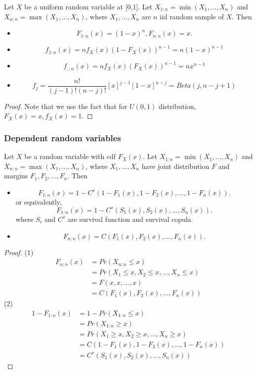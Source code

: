 \begin{refsection}
\begin{corollary}
	Let $X$ be a uniform random variable at [0,1]. Let $X_{1:n} = \min(X_1,...,X_n)$ and $X_{n:n} = \max(X_1,...,X_n)$, where $X_1,...,X_n$ are $n$ iid random sample of $X$. Then
	\begin{itemize}
		\item $$F_{1:n}(x) = (1-x)^n, F_{n:n}(x) = x.$$
		\item $$ f_{1:n}(x) = nf_X(x)(1 - F_X(x))^{n-1} = n(1-x)^{n-1}$$
		\item $$ f_{,:n}(x) = nf_X(x)(F_X(x))^{n-1} = nx^{n-1}$$
		\item $$f_j = \frac{n!}{(j-1)!(n-j)!} [x]^{j-1}[1-x]^{n-j} = Beta(j,n-j+1)$$
	\end{itemize}
\end{corollary}
\begin{proof}
	Note that we use the fact that for $U(0,1)$ distribution, $F_X(x) = x, f_X(x) = 1$.
\end{proof}




\subsubsection{Dependent random variables}

\begin{lemma}\cite[446]{roncalli2016lecture}
	Let $X$ be a random variable with cdf $F_X(x)$. Let $X_{1:n} = \min(X_1,...,X_n)$ and $X_{n:n} = \max(X_1,...,X_n)$, where $X_1,...,X_n$ have joint distribution $F$ and margins $F_1,F_2,...,F_n$. Then
	\begin{itemize}
		\item 			
		$$ F_{1:n}(x) = 1 - C^s(1-F_1(x),1-F_2(x),...,1-F_n(x)).$$
		or equivalently,
		$$ F_{1:n}(x) = 1 - C^s(S_1(x),S_2(x),...,S_n(x)) .$$
		where $S_i$ and $C^s$ are survival function and survival copula.
		
		\item 
		
		$$ F_{n:n}(x) = C(F_1(x),F_2(x),...,F_n(x)).$$
		\end{itemize}
\end{lemma}
\begin{proof}
(1)
\begin{align*}
F_{n:n}(x) &= Pr(X_{n:n} \leq x) \\
&= Pr(X_1 \leq x, X_2\leq x,...,X_n \leq x) \\
&= F(x,x,...,x) \\
&= C(F_1(x),F_2(x),...,F_n(x))
\end{align*}	
(2)	
\begin{align*}
1-F_{1:n}(x) &= 1 - Pr(X_{1:n} \leq x) \\
&= Pr(X_{1:n} \geq x) \\
&= Pr(X_1 \geq x, X_2\geq x,...,X_n \geq x) \\
&= C(1-F_1(x),1-F_2(x),...,1-F_n(x)) \\
&= C^s(S_1(x),S_2(x),...,S_n(x)) 
\end{align*}
\end{proof}


\end{refsection}
